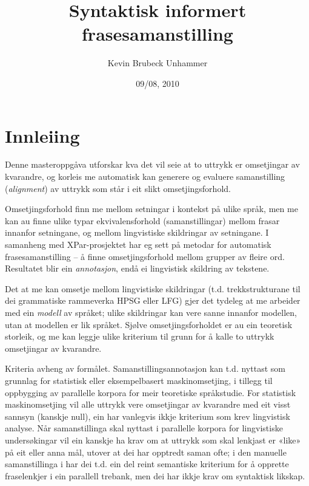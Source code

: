 \documentclass[11pt,a4paper,oneside,draft]{book}
\title{Syntaktisk informert frasesamanstilling }
\author{Kevin Brubeck Unhammer}
\date{09/08, 2010}
\begin{document}
\maketitle

\setcounter{tocdepth}{4}
\tableofcontents
\vspace*{1cm}

\listoffixmes

\chapter{Innleiing}
\label{sec-1}

\label{SEC:innleiing}


Denne masteroppgåva utforskar kva det vil seie at to uttrykk er
omsetjingar av kvarandre, og korleis me automatisk kan generere og
evaluere samanstilling (\emph{alignment}) av uttrykk som
står i eit slikt omsetjingsforhold. 

Omsetjingsforhold finn me mellom setningar i kontekst på ulike språk,
men me kan au finne ulike typar ekvivalensforhold (samanstillingar)
mellom frasar innanfor setningane, og mellom lingvistiske
skildringar av setningane. I samanheng med XPar-prosjektet
\citep{xpar2008rcn} har eg sett på metodar for automatisk
frasesamanstilling – å finne omsetjingsforhold mellom grupper av
fleire ord. Resultatet blir ein \emph{annotasjon}, endå ei lingvistisk
skildring av tekstene.



Det at me kan omsetje mellom lingvistiske skildringar
(t.d. trekkstrukturane til dei grammatiske rammeverka HPSG eller LFG)
gjer det tydeleg at me arbeider med ein \emph{modell} av språket; ulike
skildringar kan vere sanne innanfor modellen, utan at modellen er lik
språket. Sjølve omsetjingsforholdet er au ein teoretisk storleik, og
me kan leggje ulike kriterium til grunn for å kalle to uttrykk
omsetjingar av kvarandre.

Kriteria avheng av formålet. Samanstillingsannotasjon kan t.d. nyttast
som grunnlag for statistisk eller eksempelbasert maskinomsetjing, i
tillegg til oppbygging av parallelle korpora for meir teoretiske
språkstudie.  For statistisk maskinomsetjing vil alle uttrykk vere
omsetjingar av kvarandre med eit visst sannsyn (kanskje null), ein
har vanlegvis ikkje kriterium som krev lingvistisk analyse. Når
samanstillinga skal nyttast i parallelle korpora for lingvistiske
undersøkingar vil ein kanskje ha krav om at uttrykk som skal lenkjast
er «like» på eit eller anna mål, utover at dei har opptredt saman
ofte; i den manuelle samanstillinga i \citet{samuelsson2006pap} har
dei t.d. ein del reint semantiske kriterium for å opprette
fraselenkjer i ein parallell trebank, men dei har ikkje krav om
syntaktisk likskap.
\end{document}
